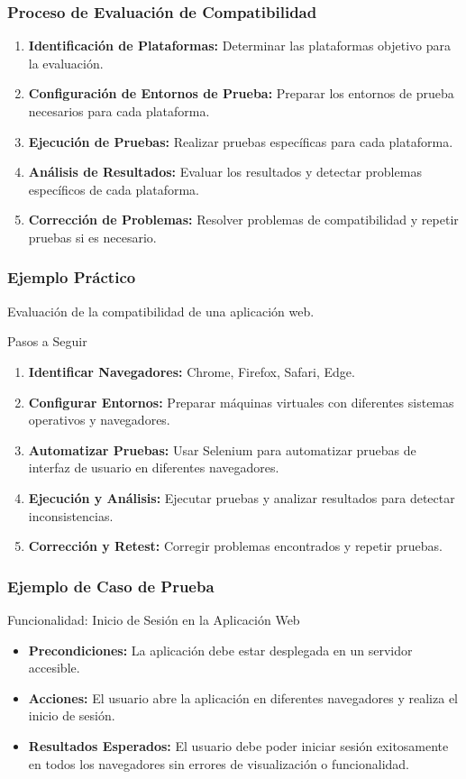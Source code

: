 \documentclass{beamer}
\begin{document}
\begin{frame}
\frametitle{Proceso de Evaluación de Compatibilidad}
\begin{enumerate}
    \item \textbf{Identificación de Plataformas:} Determinar las plataformas objetivo para la evaluación.
    \item \textbf{Configuración de Entornos de Prueba:} Preparar los entornos de prueba necesarios para cada plataforma.
    \item \textbf{Ejecución de Pruebas:} Realizar pruebas específicas para cada plataforma.
    \item \textbf{Análisis de Resultados:} Evaluar los resultados y detectar problemas específicos de cada plataforma.
    \item \textbf{Corrección de Problemas:} Resolver problemas de compatibilidad y repetir pruebas si es necesario.
\end{enumerate}
\end{frame}

\begin{frame}
\frametitle{Ejemplo Práctico}
Evaluación de la compatibilidad de una aplicación web.
\begin{block}{Pasos a Seguir}
    \begin{enumerate}
        \item \textbf{Identificar Navegadores:} Chrome, Firefox, Safari, Edge.
        \item \textbf{Configurar Entornos:} Preparar máquinas virtuales con diferentes sistemas operativos y navegadores.
        \item \textbf{Automatizar Pruebas:} Usar Selenium para automatizar pruebas de interfaz de usuario en diferentes navegadores.
        \item \textbf{Ejecución y Análisis:} Ejecutar pruebas y analizar resultados para detectar inconsistencias.
        \item \textbf{Corrección y Retest:} Corregir problemas encontrados y repetir pruebas.
    \end{enumerate}
\end{block}
\end{frame}

\begin{frame}
\frametitle{Ejemplo de Caso de Prueba}
\begin{block}{Funcionalidad: Inicio de Sesión en la Aplicación Web}
\begin{itemize}
    \item \textbf{Precondiciones:} La aplicación debe estar desplegada en un servidor accesible.
    \item \textbf{Acciones:} El usuario abre la aplicación en diferentes navegadores y realiza el inicio de sesión.
    \item \textbf{Resultados Esperados:} El usuario debe poder iniciar sesión exitosamente en todos los navegadores sin errores de visualización o funcionalidad.
\end{itemize}
\end{block}
\end{frame}
\end{document}
